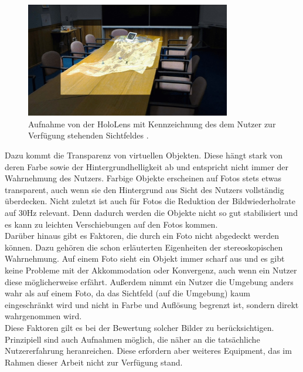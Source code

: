 \begin{figure}[h!]
	\centering
	\includegraphics[width=0.8\textwidth]{images/papers/fov.jpg}
	\caption{Aufnahme von der HoloLens mit Kennzeichnung des dem Nutzer zur Verfügung stehenden Sichtfeldes \cite{Nguyen17}.}
	\label{img:fov_comp}
\end{figure}

Dazu kommt die Transparenz von virtuellen Objekten. Diese hängt stark von deren Farbe sowie der Hintergrundhelligkeit ab und entspricht nicht immer der Wahrnehmung des Nutzers. Farbige Objekte erscheinen auf Fotos stets etwas transparent, auch wenn sie den Hintergrund aus Sicht des Nutzers vollständig überdecken. Nicht zuletzt ist auch für Fotos die Reduktion der Bildwiederholrate auf 30Hz relevant. Denn dadurch werden die Objekte nicht so gut stabilisiert und es kann zu leichten Verschiebungen auf den Fotos kommen.\\

Darüber hinaus gibt es Faktoren, die durch ein Foto nicht abgedeckt werden können. Dazu gehören die schon erläuterten Eigenheiten der stereoskopischen Wahrnehmung. Auf einem Foto sieht ein Objekt immer scharf aus und es gibt keine Probleme mit der Akkommodation oder Konvergenz, auch wenn ein Nutzer diese möglicherweise erfährt. Außerdem nimmt ein Nutzer die Umgebung anders wahr als auf einem Foto, da das Sichtfeld (auf die Umgebung) kaum eingeschränkt wird und nicht in Farbe und Auflösung begrenzt ist, sondern direkt wahrgenommen wird.\\

Diese Faktoren gilt es bei der Bewertung solcher Bilder zu berücksichtigen. Prinzipiell sind auch Aufnahmen möglich, die näher an die tatsächliche Nutzererfahrung heranreichen. Diese erfordern aber weiteres Equipment, das im Rahmen dieser Arbeit nicht zur Verfügung stand.

